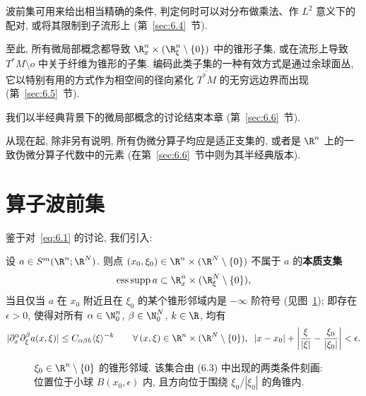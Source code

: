 波前集可用来给出相当精确的条件, 判定何时可以对分布做乘法、作 $L^2$ 意义下的配对, 或将其限制到子流形上 (第~\ref{sec:6.4}~节).

至此, 所有微局部概念都导致 $\R^n_x \times (\R^n_\xi \setminus \{0\})$ 中的锥形子集, 或在流形上导致 $T^* M \setminus o$ 中关于纤维为锥形的子集. 编码此类子集的一种有效方式是通过余球面丛, 它以特别有用的方式作为相空间的径向紧化 $\overline{T^* M}$ 的无穷远边界而出现 (第~\ref{sec:6.5}~节).

我们以半经典背景下的微局部概念的讨论结束本章 (第~\ref{sec:6.6}~节).

从现在起, 除非另有说明, 所有伪微分算子均应是适正支集的, 或者是 $\R^n$ 上的一致伪微分算子代数中的元素 (在第~\ref{sec:6.6}~节中则为其半经典版本).

\section{算子波前集}\label{sec:6.1}
%
%

鉴于对~\eqref{eq:6.1} 的讨论, 我们引入:

\begin{definition}[本质支集]\label{def:6.1}
设 $a \in S^m(\R^n; \R^N)$. 则点 $(x_0, \xi_0) \in \R^n \times (\R^N \setminus \{0\})$ 不属于 $a$ 的\textbf{本质支集}
\begin{equation}\label{eq:6.2}
    \esupp a \subset \R^n_x \times (\R^N_\xi \setminus \{0\}),
\end{equation}
当且仅当 $a$ 在 $x_0$ 附近且在 $\xi_0$ 的某个锥形邻域内是 $-\infty$ 阶符号 (见图~\ref{fig:6.1}); 即存在 $\epsilon > 0$, 使得对所有 $\alpha \in \N_0^n$, $\beta \in \N_0^N$, $k \in \R$, 均有
\begin{equation}\label{eq:6.3}
    |\partial_x^\alpha \partial_\xi^\beta a(x, \xi)| \le C_{\alpha \beta k} \langle \xi \rangle^{-k} \qquad \forall\, (x, \xi) \in \R^n \times (\R^N \setminus \{0\}), \;\; |x - x_0| + \left| \frac{\xi}{|\xi|} - \frac{\xi_0}{|\xi_0|} \right| < \epsilon.
\end{equation}
\end{definition}

\begin{figure}[htbp]
\centering
\drawFigSixOne
\caption{$\xi_0 \in \R^n \setminus \{0\}$ 的锥形邻域. 该集合由 (6.3) 中出现的两类条件刻画: 位置位于小球 $B(x_0, \epsilon)$ 内, 且方向位于围绕 $\xi_0/|\xi_0|$ 的角锥内.}
\label{fig:6.1}
\end{figure}

